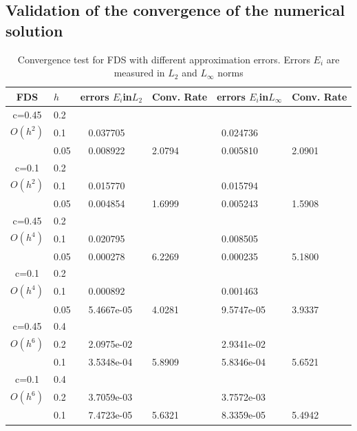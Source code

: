 \documentclass[preprint]{elsarticle}
\begin{document}
 \subsection{Validation of the convergence of the numerical solution}\label{val-conv}
\begin{center}
\begin{table}[ht]
\centering
		\begin{tabular}{||c|l|ll|ll||}
			\hline
			\hline
      FDS       & $h$ &errors $E_i$in$L_2$&Conv. Rate& errors $E_i$in$L_\infty$&Conv. Rate\\
   			\hline 
					\hline 
      c=0.45    &0.2    &             &            &           &   \\
   $O(h^2)$     &0.1    &~ 0.037705  &            &~0.024736 &   \\
                &0.05   &~ 0.008922  &2.0794  &~0.005810 & 2.0901 \\
               	 \hline 
     c=0.1      &0.2   &             &           &                & \\
     $O(h^2)$   &0.1   &~ 0.015770  &             &~0.015794      &    \\
                &0.05  &~ 0.004854 & 1.6999       &~0.005243      & 1.5908  \\
			\hline
			\hline 	
      c=0.45    &0.2   &            &            &             &    \\
       $O(h^4)$ &0.1   &~ 0.020795   &           &~0.008505  &   \\
                &0.05  &~ 0.000278 & 6.2269    &~0.000235  & 5.1800  \\
					  			\hline 	
     c=0.1      &0.2  &            &               &               &     \\
     $O(h^4)$  &0.1   &~ 0.000892  &              &~0.001463      &        \\
               &0.05  &~ 5.4667e-05&4.0281        &~9.5747e-05 &  3.9337        \\
			\hline
    \hline
   c=0.45       &0.4   &            &        &                  &      \\
     $O(h^6)$   &0.2   &~ 2.0975e-02 &           &~2.9341e-02      &       \\
     &0.1  &~ 3.5348e-04 &5.8909  &~5.8346e-04 & 5.6521         \\
	  \hline
   c=0.1       &0.4   &             &        &               &        \\
     $O(h^6)$  &0.2   &~ 3.7059e-03  &        &~3.7572e-03     &       \\
   &0.1  &~ 7.4723e-05 &5.6321  &~8.3359e-05&   5.4942       \\
	   \hline
			\hline 
		\end{tabular}
		\caption{Convergence test for  FDS with different approximation errors. Errors $E_i$ are measured in $L_2$ and $L_\infty$ norms}

\label{tab:a}
\end{table}
\end{center}
\end{document}
